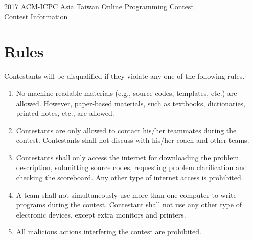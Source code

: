 \begin{center}
{\LARGE 2017 ACM-ICPC Asia Taiwan Online Programming Contest}\\
{\LARGE Contest Information}
\end{center}


\section*{Rules}
Contestants will be disqualified if they violate any one of the following rules.
\begin{enumerate}
\item No machine-readable materials (e.g., source codes, templates, etc.) are allowed. However, paper-based materials, such as textbooks, dictionaries, printed notes, etc., are allowed.
\item Contestants are only allowed to contact his/her teammates during the contest. Contestants shall not discuss with his/her coach and other teams.
\item Contestants shall only access the internet for downloading the problem description, submitting source codes, requesting problem clarification and checking the scoreboard. Any other type of internet access is prohibited.
\item A team shall not simultaneously use more than one computer to write programs during the contest. Contestant shall not use any other type of electronic devices, except extra monitors and printers.
\item All malicious actions interfering the contest are prohibited.
\end{enumerate}

